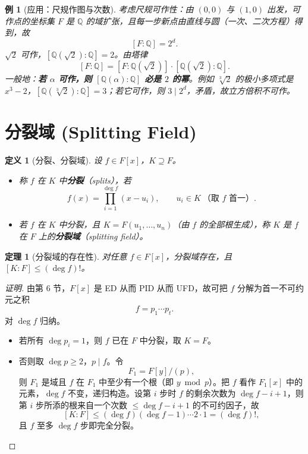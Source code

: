 \documentclass[11pt,a4paper]{ctexart}
\newtheorem*{theorem}{定理}
\newtheorem*{definition}{定义}
\newtheorem*{example}{例}
\theoremstyle{remark}
\begin{document}
\begin{example}[应用：尺规作图与次数]
考虑尺规可作性：由 $(0,0)$ 与 $(1,0)$ 出发，可作点的坐标集 $F$ 是 $\mathbb{Q}$ 的域扩张，且每一步新点由直线与圆（一次、二次方程）得到，故
\[
[F:\mathbb{Q}]=2^{d}.
\]
$\sqrt2$ 可作，$[\mathbb{Q}(\sqrt2):\mathbb{Q}]=2$。由塔律
\[
[F:\mathbb{Q}]=[F:\mathbb{Q}(\sqrt2)]\cdot[\mathbb{Q}(\sqrt2):\mathbb{Q}].
\]
一般地：\textbf{若 $\alpha$ 可作，则 $[\mathbb{Q}(\alpha):\mathbb{Q}]$ 必是 $2$ 的幂}。例如 $\sqrt[3]{2}$ 的极小多项式是 $x^{3}-2$，$[\mathbb{Q}(\sqrt[3]{2}):\mathbb{Q}]=3$；若它可作，则 $3\mid2^{d}$，矛盾，故立方倍积不可作。
\end{example}

\section*{分裂域 (Splitting Field)}

\begin{definition}[分裂、分裂域]
设 $f\in F[x]$，$K\supseteq F$。
\begin{itemize}
    \item 称 $f$ 在 $K$ 中\textbf{分裂}（splits），若
    \[
    f(x)=\prod_{i=1}^{\deg f}(x-u_i),\qquad u_i\in K\ \text{（取 $f$ 首一）}.
    \]
    \item 若 $f$ 在 $K$ 中分裂，且 $K=F(u_1,\dots,u_n)$（由 $f$ 的全部根生成），称 $K$ 是 $f$ 在 $F$ 上的\textbf{分裂域}（splitting field）。
\end{itemize}
\end{definition}

\begin{theorem}[分裂域的存在性]
对任意 $f\in F[x]$，分裂域存在，且 $[K:F]\le(\deg f)!$。
\end{theorem}

\begin{proof}[证明]
由第 6 节，$F[x]$ 是 ED 从而 PID 从而 UFD，故可把 $f$ 分解为首一不可约元之积
\[
f=p_1\cdots p_t .
\]
对 $\deg f$ 归纳。
\begin{itemize}
    \item 若所有 $\deg p_i=1$，则 $f$ 已在 $F$ 中分裂，取 $K=F$。
    \item 否则取 $\deg p\ge2$，$p\mid f$。令
    \[
    F_1=F[y]/(p),
    \]
    则 $F_1$ 是域且 $f$ 在 $F_1$ 中至少有一个根（即 $y\bmod p$）。把 $f$ 看作 $F_1[x]$ 中的元素，$\deg f$ 不变，递归构造。设第 $i$ 步时 $f$ 的剩余次数为 $\deg f-i+1$，则第 $i$ 步所添的根来自一个次数 $\le\deg f-i+1$ 的不可约因子，故
    \[
    [K:F]\le(\deg f)(\deg f-1)\cdots 2\cdot 1=(\deg f)! ,
    \]
    且 $f$ 至多 $\deg f$ 步即完全分裂。\qedhere
\end{itemize}
\end{proof}
\end{document}
